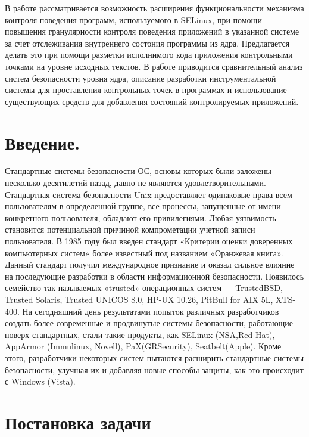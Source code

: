 {} 

{\large В работе рассматривается возможность расширения функциональности 
механизма контроля поведения программ, используемого в SELinux, при 
помощи повышения гранулярности контроля поведения приложений
в указанной системе за счет отслеживания внутреннего состония
программы из ядра. Предлагается делать это при помощи
разметки исполнимого кода приложения контрольными точками 
на уровне исходных текстов. В работе приводится сравнительный 
анализ систем безопасности уровня ядра, описание разработки 
инструментальной системы для проставления контрольных точек 
в программах и использование существующих средств для добавления
состояний контролируемых приложений. 
}

\newpage
\tableofcontents
\newpage

\bigskip 
\section{Введение.}


Стандартные системы безопасности ОС, основы которых 
были заложены несколько десятилетий назад, давно не 
являются удовлетворительными. Стандартная система 
безопасности Unix предоставляет одинаковые права всем 
пользователям в определенной группе, все процессы, 
запущенные от имени конкретного пользователя, обладают 
его привилегиями. Любая уязвимость становится 
потенциальной причиной компрометации учетной записи 
пользователя. В 1985 году был введен стандарт «Критерии 
оценки доверенных компьютерных систем» более известный 
под названием «Оранжевая книга». Данный стандарт получил 
международное признание и оказал сильное влияние на 
последующие разработки в области информационной безопасности. 
Появилось семейство так называемых «trusted» операционных 
систем — TrustedBSD, Trusted Solaris, Trusted UNICOS 8.0, 
HP-UX 10.26, PitBull for AIX 5L, XTS-400. На сегодняшний 
день результатами попыток различных разработчиков создать 
более современные и продвинутые системы безопасности, 
работающие поверх стандартных, стали такие продукты, как 
SELinux (NSA,Red Hat), AppArmor (Immulinux, Novell), 
PaX(GRSecurity), Seatbelt(Apple). Кроме этого, разработчики 
некоторых систем пытаются расширить стандартные системы 
безопасности, улучшая их и добавляя новые способы защиты, 
как это происходит с Windows (Vista). 


\section{Постановка задачи}
